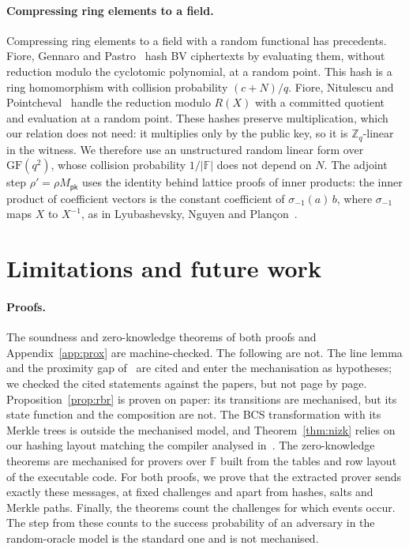 \documentclass[sigconf,anonymous]{acmart}
\newcommand{\Zq}{\mathbb{Z}_q}
\newcommand{\F}{\mathbb{F}}
\newcommand{\Mpk}{M_{\mathsf{pk}}}
\begin{document}
\paragraph{Compressing ring elements to a field.}
Compressing ring elements to a field with a random functional has precedents. Fiore, Gennaro and
Pastro~\cite{FGP14} hash BV ciphertexts by evaluating them, without reduction modulo the cyclotomic
polynomial, at a random point. This hash is a ring homomorphism with collision probability $(c+N)/q$.
Fiore, Nitulescu and Pointcheval~\cite{FNP20} handle the reduction modulo $R(X)$ with a committed
quotient and evaluation at a random point. These hashes preserve multiplication, which our relation
does not need: it multiplies only by the public key, so it is $\Zq$-linear in the witness. We
therefore use an unstructured random linear form over $\mathrm{GF}(q^2)$, whose collision probability
$1/|\F|$ does not depend on $N$. The adjoint step $\rho'=\rho\Mpk$ uses the identity behind lattice
proofs of inner products: the inner product of coefficient vectors is the constant coefficient of
$\sigma_{-1}(a)\,b$, where $\sigma_{-1}$ maps $X$ to $X^{-1}$, as in Lyubashevsky, Nguyen and
Plan\c{c}on~\cite{LNP22}.

\section{Limitations and future work}
\label{sec:limits}

\paragraph{Proofs.}
The soundness and zero-knowledge theorems of both proofs and Appendix~\ref{app:prox} are
machine-checked. The following are not. The line lemma and the proximity gap
of~\cite{DP23,BCIKS20} are cited and enter the mechanisation as hypotheses; we checked the cited
statements against the papers, but not page by page. Proposition~\ref{prop:rbr} is proven on paper:
its transitions are mechanised, but its state function and the composition are not. The BCS
transformation with its Merkle trees is outside the mechanised model, and Theorem~\ref{thm:nizk}
relies on our hashing layout matching the compiler analysed in~\cite{BCS16,CMS19}. The
zero-knowledge theorems are mechanised for provers over $\F$ built from the tables and row layout of
the executable code. For both proofs, we prove that the extracted prover sends exactly these
messages, at fixed challenges and apart from hashes, salts and Merkle paths. Finally, the theorems
count the challenges for which events occur. The step from these counts to the success probability
of an adversary in the random-oracle model is the standard one and is not mechanised.
\end{document}
